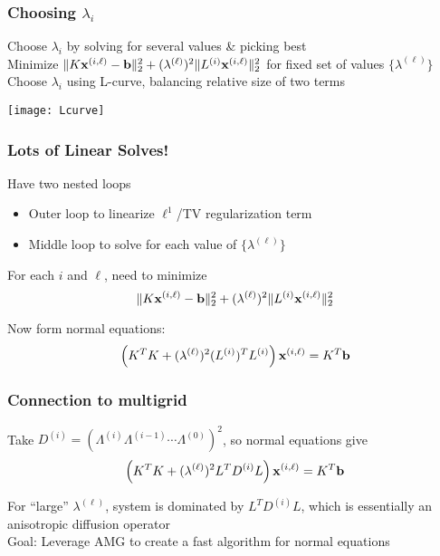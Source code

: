 \documentclass[12pt,t,xcolor=dvipsnames]{beamer}
\renewcommand{\vec}[1]{{\bf #1}}
\renewcommand{\vec}[1]{{\bf #1}}
\begin{document}
\begin{frame}
  \frametitle{Choosing $\lambda_i$}
  
  Choose $\lambda_i$ by solving for several values \& picking best \\[9pt]

Minimize $\|K\vec{x}^{(i,\ell)}-\vec{b}\|_2^2 + (\lambda^{(\ell)})^2\|L^{(i)}\vec{x}^{(i,\ell)}\|_2^2$
  for fixed set of values $\{\lambda^{(\ell)}\}$ \\[9pt]

  Choose $\lambda_i$ using L-curve, balancing relative size of two terms

  \begin{center}
      \texttt{[image: Lcurve]}
    \end{center}
  
\end{frame}

\begin{frame}
  \frametitle{Lots of Linear Solves!}

  Have two nested loops
  \begin{itemize}
  \item Outer loop to linearize $\ell^1$/TV regularization term
  \item Middle loop to solve for each value of
      $\{\lambda^{(\ell)}\}$
    
  \end{itemize}

  For each $i$ and $\ell$, need to minimize
  \[
\|K\vec{x}^{(i,\ell)}-\vec{b}\|_2^2 + (\lambda^{(\ell)})^2\|L^{(i)}\vec{x}^{(i,\ell)}\|_2^2
\]

Now form normal equations:
\[
\left(K^TK + (\lambda^{(\ell)})^2(L^{(i)})^TL^{(i)}\right)\vec{x}^{(i,\ell)} = K^T\vec{b}
\]
\end{frame}

\begin{frame}
  \frametitle{Connection to multigrid}

  Take $D^{(i)} =
  \left(\Lambda^{(i)}\Lambda^{(i-1)}\cdots\Lambda^{(0)}\right)^2$, so normal
  equations give
\[
\left(K^TK + (\lambda^{(\ell)})^2L^TD^{(i)}L\right)\vec{x}^{(i,\ell)} = K^T\vec{b}
\]

For ``large'' $\lambda^{(\ell)}$, system is dominated by $L^TD^{(i)}L$,
which is essentially an anisotropic diffusion operator \\[18pt]

\alert{Goal:} Leverage AMG to create a fast algorithm for normal equations

\end{frame}
\end{document}
